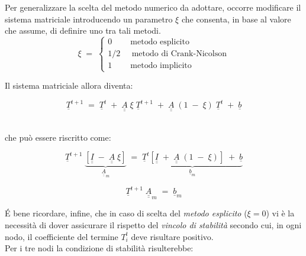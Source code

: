 

\newpage

\noindent
Per generalizzare la scelta del metodo numerico da adottare, occorre modificare il sistema matriciale introducendo un parametro $\xi$ che consenta, in base al valore che assume, di definire uno tra tali metodi.\\

$$
\xi \;=\;
\begin{cases}
	0 \;\;\;\;\;\;\;\; \mbox{metodo esplicito}\\
	1/2 \;\;\;\;\; \mbox{metodo di Crank-Nicolson}\\
	1 \;\;\;\;\;\;\;\; \mbox{metodo implicito}
\end{cases}
$$

\vspace{0.3cm}

\noindent
Il sistema matriciale allora diventa:

$$
\underline{T}^{t+1} \;=\; \underline{T}^{t} \;+\;  \underline{\underline{A}} \;  \xi \; \underline{T}^{t+1} \;+\;  \underline{\underline{A}} \;  \left(1 \;-\; \xi \right) \;  \underline{T}^{t} \;+\;  \underline{b}
$$

\noindent
\\che può essere riscritto come:

$$
\underline{T}^{t+1} \; \underbrace{\left[\underline{\underline{I}} \;-\; \underline{\underline{A}} \;  \xi \right]}_{\underline{\underline{A}}_m} \;=\; \underbrace{ 
	\underline{T}^{t} \left[ \underline{\underline{I}} \;+\;  \underline{\underline{A}} \;  \left(1 \;-\; \xi \right) \right] \;+\;  \underline{b}}_{\underline{b}_m}
$$

$$
\underline{T}^{t+1} \; \underline{\underline{A}}_m \;=\; \underline{b}_m
$$

\noindent
É bene ricordare, infine, che in caso di scelta del \textit{metodo esplicito} ($\xi =0 $) vi è la necessità di dover assicurare il rispetto del \textit{vincolo di stabilità} secondo cui, in ogni nodo, il coefficiente del termine $T_i^t$ deve risultare positivo.\\
Per i tre nodi la condizione di stabilità risulterebbe:

